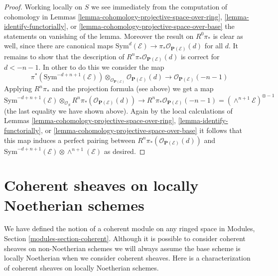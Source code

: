 \begin{proof}
\medskip\noindent
Working locally on $S$ we see immediately from the computation of
cohomology in Lemmas \ref{lemma-cohomology-projective-space-over-ring},
\ref{lemma-identify-functorially}, or
\ref{lemma-cohomology-projective-space-over-base} the statements on
vanishing of the lemma. Moreover the result on $R^0\pi_*$ is clear
as well, since there are canonical maps
$\text{Sym}^d(\mathcal{E}) \to \pi_* \mathcal{O}_{\mathbf{P}(\mathcal{E})}(d)$
for all $d$. It remains to show that the description of
$R^n\pi_*\mathcal{O}_{\mathbf{P}(\mathcal{E})}(d)$ is correct
for $d < -n - 1$. In other to do this we consider the map
$$
\pi^*(\text{Sym}^{-d + n + 1}(\mathcal{E}))
\otimes_{\mathcal{O}_{\mathbf{P}(\mathcal{E})}}
\mathcal{O}_{\mathbf{P}(\mathcal{E})}(d)
\longrightarrow
\mathcal{O}_{\mathbf{P}(\mathcal{E})}(-n - 1)
$$
Applying $R^n\pi_*$ and the projection formula (see above) we get a map
$$
\text{Sym}^{-d + n + 1}(\mathcal{E})
\otimes_{\mathcal{O}_S}
R^n\pi_*(\mathcal{O}_{\mathbf{P}(\mathcal{E})}(d))
\longrightarrow
R^n\pi_*\mathcal{O}_{\mathbf{P}(\mathcal{E})}(-n - 1) =
(\wedge^{n + 1}\mathcal{E})^{\otimes -1}
$$
(the last equality we have shown above).
Again by the local calculations of Lemmas
\ref{lemma-cohomology-projective-space-over-ring},
\ref{lemma-identify-functorially}, or
\ref{lemma-cohomology-projective-space-over-base}
it follows that this map induces a perfect pairing between
$R^n\pi_*(\mathcal{O}_{\mathbf{P}(\mathcal{E})}(d))$ and
$\text{Sym}^{-d + n + 1}(\mathcal{E}) \otimes \wedge^{n + 1}(\mathcal{E})$
as desired.
\end{proof}

















\section{Coherent sheaves on locally Noetherian schemes}
\label{section-coherent-sheaves}

\noindent
We have defined the notion of a coherent module on any ringed space in
Modules, Section \ref{modules-section-coherent}.
Although it is possible to consider coherent sheaves on non-Noetherian
schemes we will always assume the base scheme is locally Noetherian when
we consider coherent sheaves. Here is a characterization of coherent
sheaves on locally Noetherian schemes.


